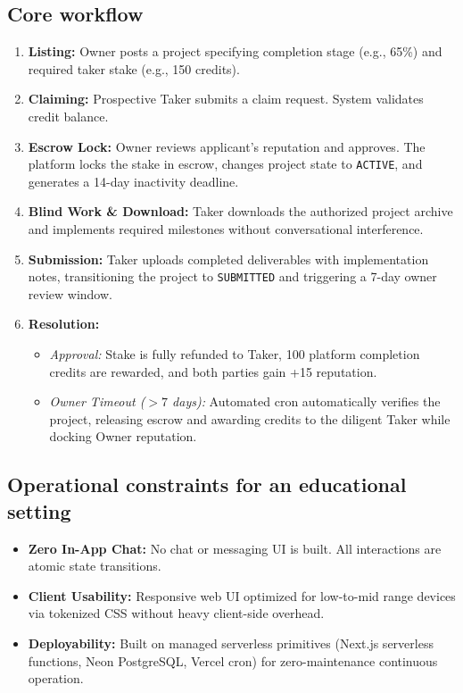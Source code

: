 \documentclass[11pt,a4paper]{article}
\begin{document}
\subsection{Core workflow}
\begin{enumerate}
    \item \textbf{Listing:} Owner posts a project specifying completion stage (e.g., 65\%) and required taker stake (e.g., 150 credits).
    \item \textbf{Claiming:} Prospective Taker submits a claim request. System validates credit balance.
    \item \textbf{Escrow Lock:} Owner reviews applicant's reputation and approves. The platform locks the stake in escrow, changes project state to \texttt{ACTIVE}, and generates a 14-day inactivity deadline.
    \item \textbf{Blind Work \& Download:} Taker downloads the authorized project archive and implements required milestones without conversational interference.
    \item \textbf{Submission:} Taker uploads completed deliverables with implementation notes, transitioning the project to \texttt{SUBMITTED} and triggering a 7-day owner review window.
    \item \textbf{Resolution:} 
    \begin{itemize}
        \item \textit{Approval:} Stake is fully refunded to Taker, 100 platform completion credits are rewarded, and both parties gain +15 reputation.
        \item \textit{Owner Timeout ($>7$ days):} Automated cron automatically verifies the project, releasing escrow and awarding credits to the diligent Taker while docking Owner reputation.
    \end{itemize}
\end{enumerate}

\subsection{Operational constraints for an educational setting}
\begin{itemize}
    \item \textbf{Zero In-App Chat:} No chat or messaging UI is built. All interactions are atomic state transitions.
    \item \textbf{Client Usability:} Responsive web UI optimized for low-to-mid range devices via tokenized CSS without heavy client-side overhead.
    \item \textbf{Deployability:} Built on managed serverless primitives (Next.js serverless functions, Neon PostgreSQL, Vercel cron) for zero-maintenance continuous operation.
\end{itemize}
\end{document}

